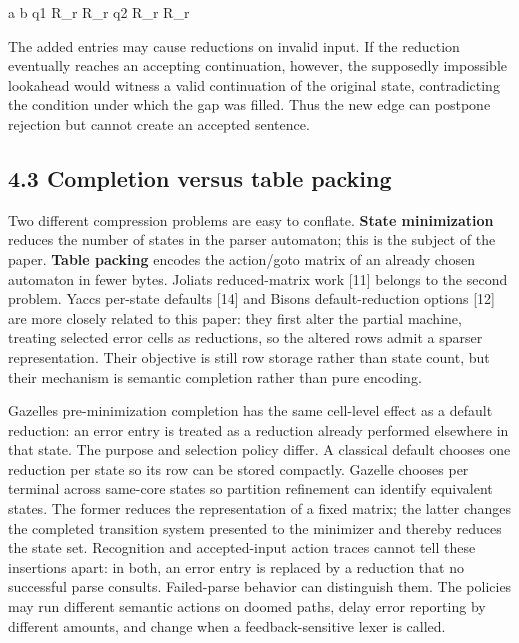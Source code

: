 \documentclass[
  10pt,
]{article}
\newenvironment{Shaded}{}{}
\newcommand{\NormalTok}[1]{#1}
\begin{document}
\begin{Shaded}
\begin{Highlighting}[]
\NormalTok{       a       b}
\NormalTok{q1    R\_r     R\_r}
\NormalTok{q2    R\_r     R\_r}
\end{Highlighting}
\end{Shaded}

The added entries may cause reductions on invalid input. If the
reduction eventually reaches an accepting continuation, however, the
supposedly impossible lookahead would witness a valid continuation of
the original state, contradicting the condition under which the gap was
filled. Thus the new edge can postpone rejection but cannot create an
accepted sentence.

\hypertarget{43-completion-versus-table-packing}{%
\subsection{4.3 Completion versus table
packing}\label{43-completion-versus-table-packing}}

Two different compression problems are easy to conflate. \textbf{State
minimization} reduces the number of states in the parser automaton; this
is the subject of the paper. \textbf{Table packing} encodes the
action/goto matrix of an already chosen automaton in fewer bytes.
Joliat\textquotesingle s reduced-matrix work {[}11{]} belongs to the
second problem. Yacc\textquotesingle s per-state defaults {[}14{]} and
Bison\textquotesingle s default-reduction options {[}12{]} are more
closely related to this paper: they first alter the partial machine,
treating selected error cells as reductions, so the altered rows admit a
sparser representation. Their objective is still row storage rather
than state count, but their mechanism is semantic completion rather
than pure encoding.

Gazelle\textquotesingle s pre-minimization completion has the same
cell-level effect as a default reduction: an error entry is treated as a
reduction already performed elsewhere in that state. The purpose and
selection policy differ. A classical default chooses one reduction per
state so its row can be stored compactly. Gazelle chooses per terminal
across same-core states so partition refinement can identify equivalent
states. The former reduces the representation of a fixed matrix; the
latter changes the completed transition system presented to the
minimizer and thereby reduces the state set. Recognition and
accepted-input action traces cannot tell
these insertions apart: in both, an error entry is replaced by a
reduction that no successful parse consults. Failed-parse behavior can
distinguish them. The policies may run different semantic actions on
doomed paths, delay error reporting by different amounts, and change
when a feedback-sensitive lexer is called.
\end{document}
